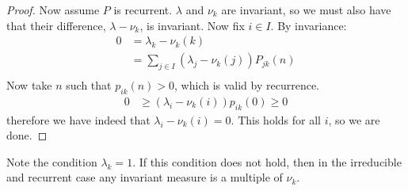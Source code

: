 \documentclass[../Main.tex]{subfiles}
\begin{document}
\begin{proof}
    Now assume $P$ is recurrent. $\lambda$ and $\nu_k$ are invariant, so we must also have that their difference, $\lambda - \nu_k$, is invariant. Now fix $i \in I$. By invariance:
    \begin{align*}
        0 &= \lambda_k - \nu_k(k) \\
        &= \sum_{j \in I} (\lambda_j - \nu_k(j))P_{jk}(n) \\
    \end{align*}
    Now take $n$ such that $p_{ik}(n) > 0$, which is valid by recurrence.
    \begin{align*}
        0 &\geq (\lambda_i - \nu_k(i)) p_{ik}(0) \geq 0
    \end{align*}
    therefore we have indeed that $\lambda_i - \nu_k(i) = 0$. This holds for all $i$, so we are done.
\end{proof}
\begin{remark}
    Note the condition $\lambda_k = 1$. If this condition does not hold, then in the irreducible and recurrent case any invariant measure is a multiple of $\nu_k$.
\end{remark}
\end{document}
